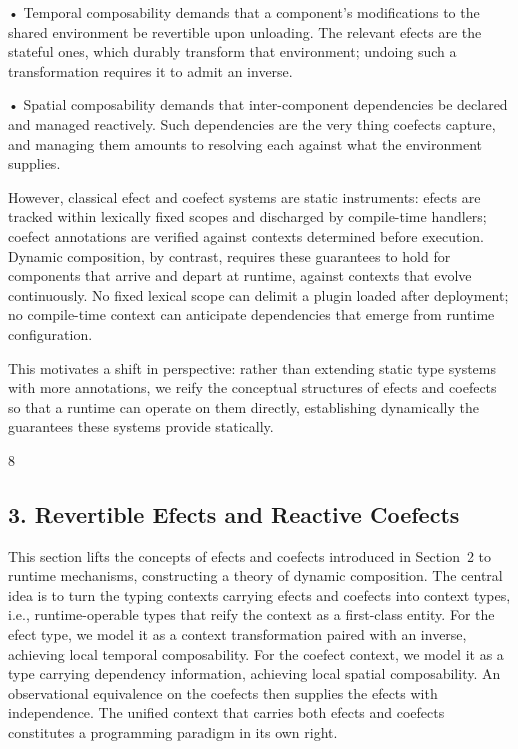 \documentclass[
  10
]{article}
\begin{document}
• Temporal composability demands that a component's modifications to the
shared environment be revertible upon unloading. The relevant efects are
the stateful ones, which durably transform that environment; undoing
such a transformation requires it to admit an inverse.

• Spatial composability demands that inter-component dependencies be
declared and managed reactively. Such dependencies are the very thing
coefects capture, and managing them amounts to resolving each against
what the environment supplies.

However, classical efect and coefect systems are static instruments:
efects are tracked within lexically fixed scopes and discharged by
compile-time handlers; coefect annotations are verified against contexts
determined before execution. Dynamic composition, by contrast, requires
these guarantees to hold for components that arrive and depart at
runtime, against contexts that evolve continuously. No fixed lexical
scope can delimit a plugin loaded after deployment; no compile-time
context can anticipate dependencies that emerge from runtime
configuration.

This motivates a shift in perspective: rather than extending static type
systems with more annotations, we reify the conceptual structures of
efects and coefects so that a runtime can operate on them directly,
establishing dynamically the guarantees these systems provide
statically.

8

\subsection{3. Revertible Efects and Reactive
Coefects}\label{revertible-efects-and-reactive-coefects}

This section lifts the concepts of efects and coefects introduced in
Section~2 to runtime mechanisms, constructing a theory of dynamic
composition. The central idea is to turn the typing contexts carrying
efects and coefects into context types, i.e., runtime-operable types
that reify the context as a first-class entity. For the efect type, we
model it as a context transformation paired with an inverse, achieving
local temporal composability. For the coefect context, we model it as a
type carrying dependency information, achieving local spatial
composability. An observational equivalence on the coefects then
supplies the efects with independence. The unified context that carries
both efects and coefects constitutes a programming paradigm in its own
right.
\end{document}
